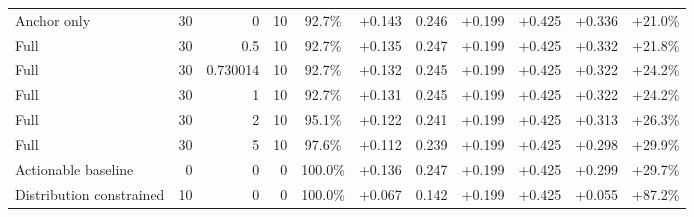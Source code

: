 \begin{table}[htbp]
\begin{tabular}{lrrrccccccc}
Anchor only & 30 & 0 & 10 & 92.7\% & +0.143 & 0.246 & +0.199 & +0.425 & +0.336 & +21.0\% \\
Full & 30 & 0.5 & 10 & 92.7\% & +0.135 & 0.247 & +0.199 & +0.425 & +0.332 & +21.8\% \\
Full & 30 & 0.730014 & 10 & 92.7\% & +0.132 & 0.245 & +0.199 & +0.425 & +0.322 & +24.2\% \\
Full & 30 & 1 & 10 & 92.7\% & +0.131 & 0.245 & +0.199 & +0.425 & +0.322 & +24.2\% \\
Full & 30 & 2 & 10 & 95.1\% & +0.122 & 0.241 & +0.199 & +0.425 & +0.313 & +26.3\% \\
Full & 30 & 5 & 10 & 97.6\% & +0.112 & 0.239 & +0.199 & +0.425 & +0.298 & +29.9\% \\
Actionable baseline & 0 & 0 & 0 & 100.0\% & +0.136 & 0.247 & +0.199 & +0.425 & +0.299 & +29.7\% \\
Distribution constrained & 10 & 0 & 0 & 100.0\% & +0.067 & 0.142 & +0.199 & +0.425 & +0.055 & +87.2\% \\
\bottomrule
\end{tabular}
\end{table}